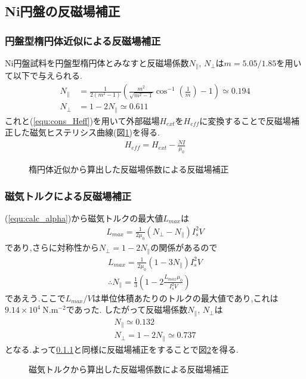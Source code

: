 \subsection{Ni円盤の反磁場補正}
\subsubsection{円盤型楕円体近似による反磁場補正}
\label{subsubsec:cons_hanjiba_daen}
Ni円盤試料を円盤型楕円体とみなすと反磁場係数$N_{\parallel}$, $N_{\perp}$は$m=5.05/1.85$を用いて以下で与えられる.
\begin{align}
  N_{\parallel}&=\frac{1}{2(m^2-1)}\left(\frac{m^2}{\sqrt{m^2-1}}\cos^{-1}\left(\frac{1}{m}\right)-1\right)\simeq0.194\\
  N_{\perp}&=1-2N_{\parallel}\simeq0.611
\end{align}
これと(\ref{equ:cons_Heff})を用いて外部磁場$H_{ext}$を$H_{eff}$に変換することで反磁場補正した磁気ヒステリシス曲線(図\ref{fig:cons_hanjiba_shape})を得る.
\begin{align}
  \label{equ:cons_Heff}
  H_{eff}=H_{ext}-\frac{NI}{\mu_0}
\end{align}
\begin{figure}[hptb]
  \begin{center}
    
    \caption{楕円体近似から算出した反磁場係数による反磁場補正}
    \label{fig:cons_hanjiba_shape}
  \end{center}
\end{figure}
\subsubsection{磁気トルクによる反磁場補正}
(\ref{equ:calc_alpha})から磁気トルクの最大値$L_{max}$は
\begin{align}
  L_{max}=\frac{1}{2\mu_0}\left(N_{\perp}-N_{\parallel}\right)I_s^2V
\end{align}
であり,さらに対称性から$N_{\perp}=1-2N_{\parallel}$の関係があるので
\begin{align}
  L_{max}=\frac{1}{2\mu_0}\left(1-3N_{\parallel}\right)I_s^2V\nonumber\\
  \therefore N_{\parallel}=\frac{1}{3}\left(1-2\frac{L_{max}\mu_0}{I_s^2V}\right)
\end{align}
であえう.ここで$L_{max}/V$は単位体積あたりのトルクの最大値であり,これは$9.14\times10^4\ \si{\newton.\metre^{-2}}$であった.
したがって反磁場係数$N_{\parallel}$, $N_{\perp}$は
\begin{align}
  N_{\parallel}\simeq0.132\\
  N_{\perp}=1-2N_{\parallel}\simeq0.737
\end{align}
となる.よって\ref{subsubsec:cons_hanjiba_daen}と同様に反磁場補正をすることで図\ref{fig:cons_hanjiba_torque}を得る.
\begin{figure}[hptb]
  \begin{center}
    
    \caption{磁気トルクから算出した反磁場係数による反磁場補正}
    \label{fig:cons_hanjiba_torque}
  \end{center}
\end{figure}
